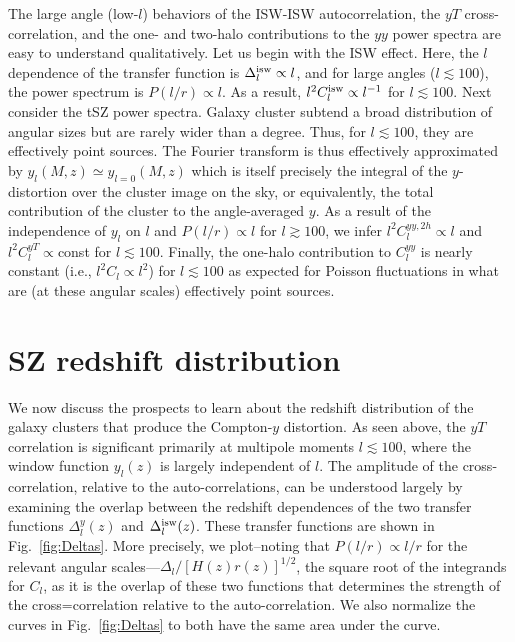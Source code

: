 \documentclass[aps,twocolumn,floats,prd,nofootinbib]{revtex4-1}
\begin{document}
The large angle (low-$l$) behaviors of the ISW-ISW
autocorrelation, the $yT$ cross-correlation, and the one- and
two-halo contributions to the $yy$ power spectra are easy to
understand qualitatively.  Let us begin with the ISW effect.  Here, the
$l$ dependence of the transfer function is $\Delta^{\rm isw}_l
\propto l$, and for large angles ($l\lesssim 100$), the power
spectrum is $P(l/r) \propto l$.  As a result, $l^2C_l^{\rm isw}
\propto l^{-1}$ for $l \lesssim 100$.  Next consider the tSZ
power spectra.  Galaxy cluster subtend a broad distribution of
angular sizes but are rarely wider than a degree.  Thus, for $l
\lesssim 100$, they are effectively point sources.  The
Fourier transform is thus effectively approximated by $y_l(M,z)
\simeq y_{l=0}(M,z)$ which is itself precisely the integral of
the $y$-distortion over the cluster image on the sky, or
equivalently, the total contribution of the cluster to the
angle-averaged $y$.  As a result of the independence of $y_l$ on
$l$ and $P(l/r) \propto l$ for $l\gtrsim100$, we infer
$l^2 C_l^{yy,2h} \propto l$ and $l^2 C_l^{yT} \propto $const for
$l\lesssim 100$.  Finally, the one-halo contribution to
$C_l^{yy}$ is nearly constant (i.e., $l^2C_l\propto l^2$) for
$l\lesssim 100$ as expected for Poisson fluctuations in what are
(at these angular scales) effectively point sources.

\section{SZ redshift distribution}

We now discuss the prospects to learn about the redshift
distribution of the galaxy clusters that produce the Compton-$y$
distortion.  As seen above, the $yT$ correlation is significant
primarily at multipole moments $l \lesssim 100$, where the
window function $y_l(z)$ is largely independent of $l$.  The
amplitude of the cross-correlation, relative to the
auto-correlations, can be understood largely by examining the
overlap between the redshift dependences of the two transfer
functions $\Delta_l^y(z)$ and $\Delta_l^{\rm isw}(z)$.  These
transfer functions are shown in Fig.~\ref{fig:Deltas}.  More
precisely, we plot--noting that $P(l/r) \propto l/r$ for the
relevant angular scales---$\Delta_l/\left[H(z) r(z) \right]^{1/2}$,
the square root of the integrands for $C_l$, as it is the
overlap of these two functions that determines the strength of
the cross=correlation relative to the auto-correlation.  We also
normalize the curves in Fig.~\ref{fig:Deltas} to both have the
same area under the curve.
\end{document}
